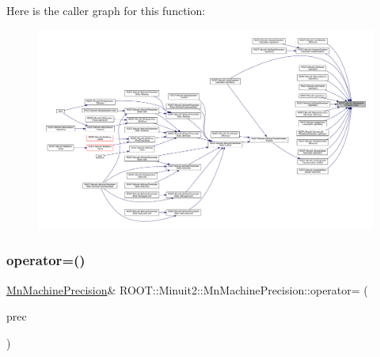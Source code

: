 Here is the caller graph for this function\+:\nopagebreak
\begin{figure}[H]
\begin{center}
\leavevmode
\includegraphics[width=350pt]{d4/d40/classROOT_1_1Minuit2_1_1MnMachinePrecision_aa71de131bc08f19d18dfeba4cb8191ce_icgraph}
\end{center}
\end{figure}
\mbox{\label{classROOT_1_1Minuit2_1_1MnMachinePrecision_a89ded7be0c8fe34ad55585e45a078355}} 
\subsubsection{\texorpdfstring{operator=()}{operator=()}\hspace{0.1cm}{\footnotesize\ttfamily [1/2]}}
{\footnotesize\ttfamily \mbox{\hyperlink{classROOT_1_1Minuit2_1_1MnMachinePrecision}{Mn\+Machine\+Precision}}\& R\+O\+O\+T\+::\+Minuit2\+::\+Mn\+Machine\+Precision\+::operator= (\begin{DoxyParamCaption}\item[{const \mbox{\hyperlink{classROOT_1_1Minuit2_1_1MnMachinePrecision}{Mn\+Machine\+Precision}} \&}]{prec }\end{DoxyParamCaption})\hspace{0.3cm}{\ttfamily [inline]}}

\mbox{\label{classROOT_1_1Minuit2_1_1MnMachinePrecision_a89ded7be0c8fe34ad55585e45a078355}} 
